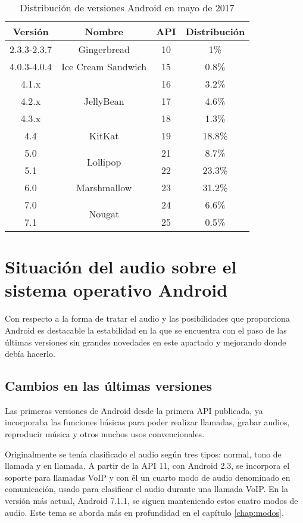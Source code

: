 \begin{table}[htb]
	\centering
	\begin{tabular}{|c|c|c|c|}
		\hline
		\textbf{Versión} & \textbf{Nombre} & \textbf{\gls{API}} & \textbf{Distribución} \\
		\hline \hline
		2.3.3-2.3.7 & Gingerbread & 10 & 1\% \\ \hline
		4.0.3-4.0.4 & Ice Cream Sandwich & 15 & 0.8\% \\ \hline
		4.1.x & \multirow{3}{1cm}{JellyBean} & 16 & 3.2\% \\ \cline{1-1} \cline{3-4}
		4.2.x & & 17 & 4.6\% \\ \cline{1-1} \cline{3-4}
		4.3.x & & 18 & 1.3\% \\ \hline
		4.4 & KitKat & 19 & 18.8\% \\ \hline
		5.0 & \multirow{2}{1cm}{Lollipop} & 21 & 8.7\% \\ \cline{1-1} \cline{3-4}
		5.1 & & 22 & 23.3\% \\ \hline
		6.0 & Marshmallow & 23 & 31.2\% \\ \hline
		7.0 & \multirow{2}{1cm}{Nougat} & 24 & 6.6\% \\ \cline{1-1} \cline{3-4}
		7.1 & & 25 & 0.5\% \\ \hline
	\end{tabular}
	\caption{Distribución de versiones Android en mayo de 2017}
	\label{tabla:distribucion-versiones}
\end{table}


\section{Situación del audio sobre el sistema operativo Android}
Con respecto a la forma de tratar el audio y las posibilidades que proporciona Android es destacable la estabilidad en la que se encuentra con el paso de las últimas versiones sin grandes novedades en este apartado y mejorando donde debía hacerlo.


\subsection{Cambios en las últimas versiones}
Las primeras versiones de Android desde la primera \gls{API} publicada, ya incorporaba las funciones básicas para poder realizar llamadas, grabar audios, reproducir música y otros muchos usos convencionales. 

Originalmente se tenía clasificado el audio según tres tipos: normal, tono de llamada y en llamada. A partir de la \gls{API} 11, con Android 2.3, se incorpora el soporte para llamadas \gls{VoIP} y con él un cuarto modo de audio denominado en comunicación, usado para clasificar el audio durante una llamada \gls{VoIP}. En la versión más actual, Android 7.1.1, se siguen manteniendo estos cuatro modos de audio. Este tema se aborda más en profundidad en el capítulo \ref{chap:modos}.

